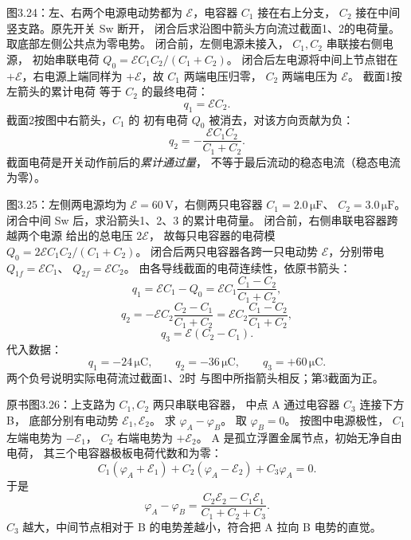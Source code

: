 图3.24：左、右两个电源电动势都为
$\mathcal E$，电容器 $C_1$ 接在右上分支，
$C_2$ 接在中间竖支路。原先开关 Sw 断开，
闭合后求沿图中箭头方向流过截面1、2的电荷量。
\exsolution
取底部左侧公共点为零电势。
闭合前，左侧电源未接入，
$C_1,C_2$ 串联接右侧电源，
初始串联电荷
$Q_0=\mathcal E C_1C_2/(C_1+C_2)$。
闭合后左电源将中间上节点钳在
$+\mathcal E$，右电源上端同样为
$+\mathcal E$，故 $C_1$ 两端电压归零，
$C_2$ 两端电压为 $\mathcal E$。
截面1按左箭头的累计电荷
等于 $C_2$ 的最终电荷：
\[
\boxed{q_1=\mathcal E C_2}.
\]
截面2按图中右箭头，$C_1$ 的
初有电荷 $Q_0$ 被消去，对该方向贡献为负：
\[
\boxed{q_2=-\frac{\mathcal E C_1C_2}{C_1+C_2}}.
\]
\excheck 截面电荷是开关动作前后的\emph{累计通过量}，
不等于最后流动的稳态电流（稳态电流为零）。

图3.25：左侧两电源均为
$\mathcal E=60\,\mathrm V$，右侧两只电容器
$C_1=2.0\,\mathrm{\mu F}$、
$C_2=3.0\,\mathrm{\mu F}$。
闭合中间 Sw 后，求沿箭头1、2、3
的累计电荷量。
\exsolution
闭合前，右侧串联电容器跨越两个电源
给出的总电压 $2\mathcal E$，
故每只电容器的电荷模
$Q_0=2\mathcal E C_1C_2/(C_1+C_2)$。
闭合后两只电容器各跨一只电动势
$\mathcal E$，分别带电
$Q_{1f}=\mathcal E C_1$、
$Q_{2f}=\mathcal E C_2$。
由各导线截面的电荷连续性，依原书箭头：
\[
\boxed{q_1=\mathcal E C_1-Q_0
=\mathcal E C_1\frac{C_1-C_2}{C_1+C_2}},
\]
\[
\boxed{q_2=-\mathcal E C_2
\frac{C_2-C_1}{C_1+C_2}
=\mathcal E C_2\frac{C_1-C_2}{C_1+C_2}},
\]
\[
\boxed{q_3=\mathcal E(C_2-C_1)}.
\]
代入数据：
\[
\boxed{q_1=-24\,\mathrm{\mu C},\qquad
q_2=-36\,\mathrm{\mu C},\qquad
q_3=+60\,\mathrm{\mu C}}.
\]
\excheck 两个负号说明实际电荷流过截面1、2时
与图中所指箭头相反；第3截面为正。

原书图3.26：上支路为
$C_1,C_2$ 两只串联电容器，
中点 A 通过电容器 $C_3$ 连接下方 B，
底部分别有电动势 $\mathcal E_1,\mathcal E_2$。
求 $\varphi_A-\varphi_B$。
\exsolution
取 $\varphi_B=0$。
按图中电源极性，
$C_1$ 左端电势为 $-\mathcal E_1$，
$C_2$ 右端电势为 $+\mathcal E_2$。
A 是孤立浮置金属节点，初始无净自由电荷，
其三个电容器极板电荷代数和为零：
\[
C_1(\varphi_A+\mathcal E_1)
+C_2(\varphi_A-\mathcal E_2)
+C_3\varphi_A=0.
\]
于是
\[
\boxed{\varphi_A-\varphi_B=
\frac{C_2\mathcal E_2-C_1\mathcal E_1}
{C_1+C_2+C_3}}.
\]
\excheck $C_3$ 越大，中间节点相对于 B
的电势差越小，符合把 A 拉向 B 电势的直觉。

